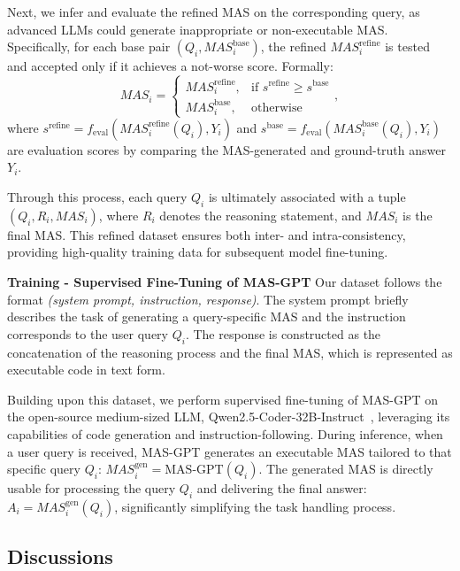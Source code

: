 \documentclass{article}
\theoremstyle{plain}
\theoremstyle{definition}
\theoremstyle{remark}
\begin{document}
Next, we infer and evaluate the refined MAS on the corresponding query, as advanced LLMs could generate inappropriate or non-executable MAS.
Specifically, for each base pair $(Q_i,MAS_i^{\text{base}})$, the refined $MAS_i^{\text{refine}}$ is tested and accepted only if it achieves a not-worse score.
Formally:
\[
MAS_i = 
\begin{cases} 
MAS_i^{\text{refine}}, & \text{if } s^{\text{refine}} \geq s^{\text{base}} \\
MAS_i^{\text{base}}, & \text{otherwise}
\end{cases},
\]
where $s^{\text{refine}}=f_{\text{eval}}(MAS_i^{\text{refine}}(Q_i), Y_i)$ and $s^{\text{base}}=f_{\text{eval}}(MAS_i^{\text{base}}(Q_i), Y_i)$ are evaluation scores by comparing the MAS-generated and ground-truth answer $Y_i$.

Through this process, each query $Q_i$ is ultimately associated with a tuple $(Q_i, R_i, MAS_i)$, where $R_i$ denotes the reasoning statement, and $MAS_i$ is the final MAS.
This refined dataset ensures both inter- and intra-consistency, providing high-quality training data for subsequent model fine-tuning.

\textbf{Training - Supervised Fine-Tuning of MAS-GPT}
Our dataset follows the format \textit{(system prompt, instruction, response)}.
The system prompt briefly describes the task of generating a query-specific MAS and the instruction corresponds to the user query $Q_i$.
The response is constructed as the concatenation of the reasoning process and the final MAS, which is represented as executable code in text form.

Building upon this dataset, we perform supervised fine-tuning of MAS-GPT on the open-source medium-sized LLM, Qwen2.5-Coder-32B-Instruct~\cite{yang2024qwen2}, leveraging its capabilities of code generation and instruction-following.
During inference, when a user query is received, MAS-GPT generates an executable MAS tailored to that specific query $Q_i$: $MAS^{\text{gen}}_i=\text{MAS-GPT}(Q_i)$.
The generated MAS is directly usable for processing the query $Q_i$ and delivering the final answer: $A_i=MAS^{\text{gen}}_i(Q_i)$, significantly simplifying the task handling process.

\subsection{Discussions}
\end{document}
